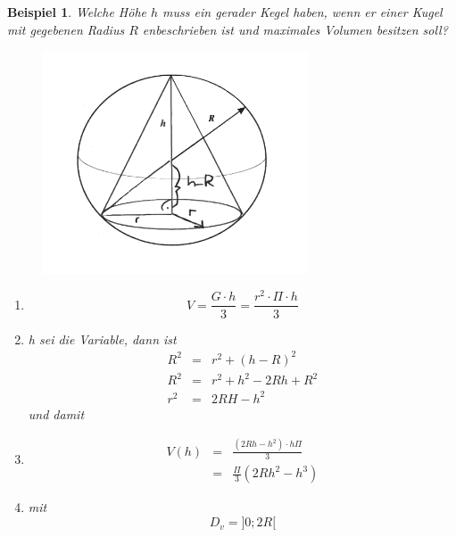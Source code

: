\documentclass{report}
\newtheorem{myexample}{Beispiel}
\begin{document}
\newpage
\begin{myexample}
	Welche Höhe $h$ muss ein gerader Kegel haben, wenn er einer Kugel mit gegebenen Radius $R$ enbeschrieben ist und maximales Volumen besitzen soll?\\
	\begin{figure}[H]
			\centering
			\includegraphics[width=0.7\textwidth]{images/extremalwertproblem2.png}
	\end{figure}
	\begin{enumerate}
		\item
		\begin{equation*}V = \frac{G\cdot h}{3}= \frac{r^2\cdot \Pi \cdot h}{3}\end{equation*}
		\item
		h sei die Variable, dann ist
		\begin{eqnarray*}
			R^2 &=& r^2 + (h-R)^2\\
			R^2 &=& r^2 + h^2 -2Rh+ R^2\\
			r^2 &=& 2RH-h^2
		\end{eqnarray*}
		und damit
		\item
		\begin{eqnarray*}
			V(h)&=& \frac{(2Rh-h^2)\cdot h\Pi}{3}\\
			&=& \frac{\Pi}{3}(2Rh^2-h^3)
		\end{eqnarray*}
		\item
		mit 
		\begin{equation*}D_v = ]0;2R[\end{equation*}
		

\end{enumerate}
\end{myexample}
\end{document}
